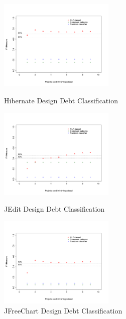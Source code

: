 \begin{figure}[thb!]
  \centering
  \vspace{21mm}
  \includegraphics[width=0.49\textwidth]{figures/appendix/iteration_details/design_hibernate.pdf}
  \vspace{-9mm}
  \caption{Hibernate Design Debt Classification}
  \label{fig:design_hibernate}
  \includegraphics[width=0.49\textwidth]{figures/appendix/iteration_details/design_jedit.pdf}
  \vspace{-9mm}
  \caption{JEdit Design Debt Classification}
  \label{fig:design_jedit}
  \includegraphics[width=0.49\textwidth]{figures/appendix/iteration_details/design_jfreechart.pdf}
  \vspace{-9mm}
  \caption{JFreeChart Design Debt Classification}
  \label{fig:design_jfreechart}
\end{figure}

